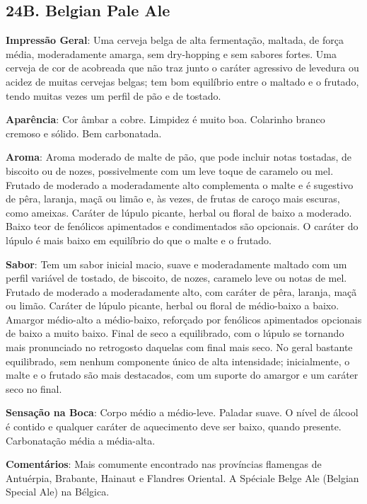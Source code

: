 \subsection*{24B. Belgian Pale Ale}
\textbf{Impressão Geral}: Uma cerveja belga de alta fermentação, maltada, de força média, moderadamente amarga, sem dry-hopping e sem sabores fortes. Uma cerveja de cor de acobreada que não traz junto o caráter agressivo de levedura ou acidez de muitas cervejas belgas; tem bom equilíbrio entre o maltado e o frutado, tendo muitas vezes um perfil de pão e de tostado.

\textbf{Aparência}: Cor âmbar a cobre. Limpidez é muito boa. Colarinho branco cremoso e sólido. Bem carbonatada.

\textbf{Aroma}: Aroma moderado de malte de pão, que pode incluir notas tostadas, de biscoito ou de nozes, possivelmente com um leve toque de caramelo ou mel. Frutado de moderado a moderadamente alto complementa o malte e é sugestivo de pêra, laranja, maçã ou limão e, às vezes, de frutas de caroço mais escuras, como ameixas. Caráter de lúpulo picante, herbal ou floral de baixo a moderado. Baixo teor de fenólicos apimentados e condimentados são opcionais. O caráter do lúpulo é mais baixo em equilíbrio do que o malte e o frutado.

\textbf{Sabor}: Tem um sabor inicial macio, suave e moderadamente maltado com um perfil variável de tostado, de biscoito, de nozes, caramelo leve ou notas de mel. Frutado de moderado a moderadamente alto, com caráter de pêra, laranja, maçã ou limão. Caráter de lúpulo picante, herbal ou floral de médio-baixo a baixo. Amargor médio-alto a médio-baixo, reforçado por fenólicos apimentados opcionais de baixo a muito baixo. Final de seco a equilibrado, com o lúpulo se tornando mais pronunciado no retrogosto daquelas com final mais seco. No geral bastante equilibrado, sem nenhum componente único de alta intensidade; inicialmente, o malte e o frutado são mais destacados, com um suporte do amargor e um caráter seco no final.

\textbf{Sensação na Boca}: Corpo médio a médio-leve. Paladar suave. O nível de álcool é contido e qualquer caráter de aquecimento deve ser baixo, quando presente. Carbonatação média a média-alta.

\textbf{Comentários}: Mais comumente encontrado nas províncias flamengas de Antuérpia, Brabante, Hainaut e Flandres Oriental. A Spéciale Belge Ale (Belgian Special Ale) na Bélgica.

